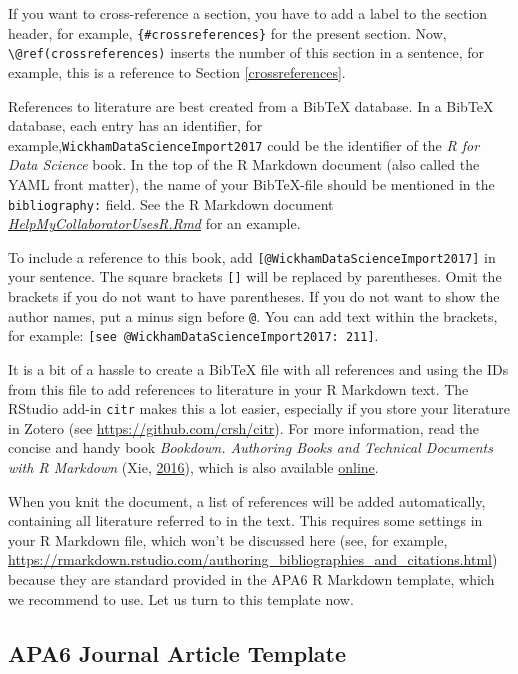 \documentclass[doc,floatsintext]{apa6}
\begin{document}
If you want to cross-reference a section, you have to add a label to the
section header, for example, \texttt{\{\#crossreferences\}} for the
present section. Now, \texttt{\textbackslash{}@ref(crossreferences)}
inserts the number of this section in a sentence, for example, this is a
reference to Section \ref{crossreferences}.

References to literature are best created from a BibTeX database. In a
BibTeX database, each entry has an identifier, for
example,\texttt{WickhamDataScienceImport2017} could be the identifier of
the \emph{R for Data Science} book. In the top of the R Markdown
document (also called the YAML front matter), the name of your
BibTeX-file should be mentioned in the \texttt{bibliography:} field. See
the R Markdown document
\href{https://wdenooy.github.io/Switch2R/HelpMyCollaboratorUsesR.Rmd}{\emph{HelpMyCollaboratorUsesR.Rmd}}
for an example.

To include a reference to this book, add
\texttt{{[}@WickhamDataScienceImport2017{]}} in your sentence. The
square brackets \texttt{{[}{]}} will be replaced by parentheses. Omit
the brackets if you do not want to have parentheses. If you do not want
to show the author names, put a minus sign before \texttt{@}. You can
add text within the brackets, for example:
\texttt{{[}see\ @WickhamDataScienceImport2017:\ 211{]}}.

It is a bit of a hassle to create a BibTeX file with all references and
using the IDs from this file to add references to literature in your R
Markdown text. The RStudio add-in \texttt{citr} makes this a lot easier,
especially if you store your literature in Zotero (see
\url{https://github.com/crsh/citr}). For more information, read the
concise and handy book \emph{Bookdown. Authoring Books and Technical
Documents with R Markdown} (Xie,
\protect\hyperlink{ref-xieBookdownAuthoringBooks2016}{2016}), which is
also available
\href{https://bookdown.org/yihui/bookdown/citations.html}{online}.

When you knit the document, a list of references will be added
automatically, containing all literature referred to in the text. This
requires some settings in your R Markdown file, which won't be discussed
here (see, for example,
\url{https://rmarkdown.rstudio.com/authoring_bibliographies_and_citations.html})
because they are standard provided in the APA6 R Markdown template,
which we recommend to use. Let us turn to this template now.

\subsection{APA6 Journal Article Template}\label{apa6template}
\end{document}
